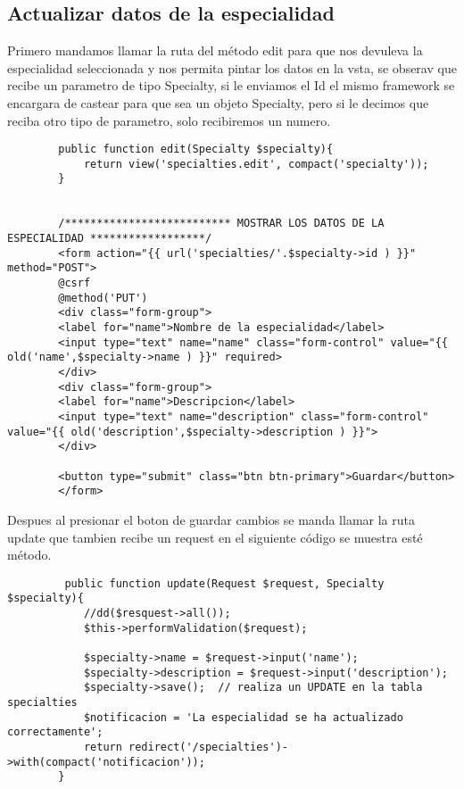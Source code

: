 \documentclass[a4paper]{article}
\begin{document}
	
	\subsection{Actualizar datos de la especialidad}
	
	Primero mandamos llamar la ruta del método edit para que nos devuleva la especialidad seleccionada y nos permita pintar los datos en la vsta, se obserav que recibe un parametro de tipo Specialty, si le enviamos el Id el mismo framework se encargara de castear para que sea un objeto Specialty, pero si le decimos que reciba otro tipo de parametro, solo recibiremos un numero.
	
	\begin{lstlisting}
		public function edit(Specialty $specialty){
			return view('specialties.edit', compact('specialty'));
		}
	
		
		/************************** MOSTRAR LOS DATOS DE LA ESPECIALIDAD ******************/
		<form action="{{ url('specialties/'.$specialty->id ) }}" method="POST">
		@csrf
		@method('PUT')
		<div class="form-group">
		<label for="name">Nombre de la especialidad</label>
		<input type="text" name="name" class="form-control" value="{{ old('name',$specialty->name ) }}" required>
		</div>
		<div class="form-group">
		<label for="name">Descripcion</label>
		<input type="text" name="description" class="form-control" value="{{ old('description',$specialty->description ) }}">
		</div>
		
		<button type="submit" class="btn btn-primary">Guardar</button>
		</form>
	\end{lstlisting} 

	
	Despues al presionar el boton de guardar cambios se manda llamar la ruta update que tambien recibe un request en el siguiente código se muestra esté método.
	
	\begin{lstlisting}
		 public function update(Request $request, Specialty $specialty){
			//dd($resquest->all());
			$this->performValidation($request);
			
			$specialty->name = $request->input('name');
			$specialty->description = $request->input('description');
			$specialty->save();  // realiza un UPDATE en la tabla specialties
			$notificacion = 'La especialidad se ha actualizado correctamente';
			return redirect('/specialties')->with(compact('notificacion'));
		}
	\end{lstlisting} 
\end{document}
